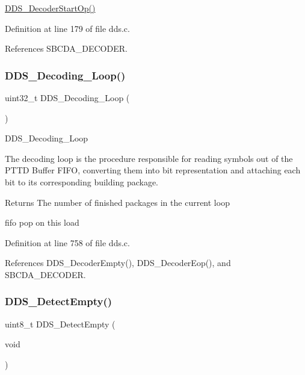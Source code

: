 \hyperlink{group___d_d_s_gae4f18ac70ccacf5b0c08f35df3a68c7e}{D\+D\+S\+\_\+\+Decoder\+Start\+Op()} 

Definition at line 179 of file dds.\+c.



References S\+B\+C\+D\+A\+\_\+\+D\+E\+C\+O\+D\+ER.

\mbox{\label{group___d_d_s_ga0d11598fca2a9f0eceb43f06a0fb2c4e}} 
\subsubsection{\texorpdfstring{D\+D\+S\+\_\+\+Decoding\+\_\+\+Loop()}{DDS\_Decoding\_Loop()}}
{\footnotesize\ttfamily uint32\+\_\+t D\+D\+S\+\_\+\+Decoding\+\_\+\+Loop (\begin{DoxyParamCaption}{ }\end{DoxyParamCaption})}

D\+D\+S\+\_\+\+Decoding\+\_\+\+Loop

The decoding loop is the procedure responsible for reading symbols out of the P\+T\+TD Buffer F\+I\+FO, converting them into bit representation and attaching each bit to its corresponding building package.

\begin{DoxyReturn}{Returns}
The number of finished packages in the current loop 
\end{DoxyReturn}
fifo pop on this load 

Definition at line 758 of file dds.\+c.



References D\+D\+S\+\_\+\+Decoder\+Empty(), D\+D\+S\+\_\+\+Decoder\+Eop(), and S\+B\+C\+D\+A\+\_\+\+D\+E\+C\+O\+D\+ER.

\mbox{\label{group___d_d_s_ga8432fe55e46d995b5b36dc8c262c0d2d}} 
\subsubsection{\texorpdfstring{D\+D\+S\+\_\+\+Detect\+Empty()}{DDS\_DetectEmpty()}}
{\footnotesize\ttfamily uint8\+\_\+t D\+D\+S\+\_\+\+Detect\+Empty (\begin{DoxyParamCaption}\item[{void}]{ }\end{DoxyParamCaption})}

